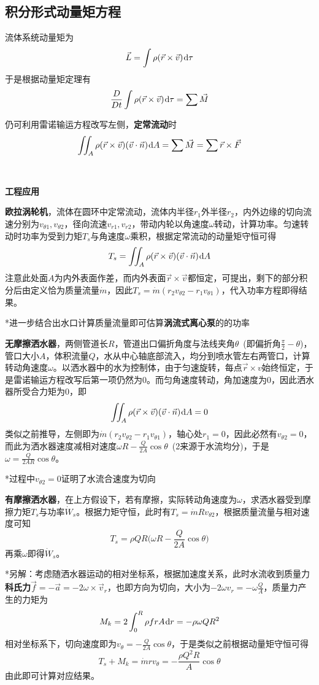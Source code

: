 \documentclass[a4paper,UTF8,fontset=windows]{ctexart}
\newcommand*{\dr}{\hspace{0.07em}\mathrm{d}}
\begin{document}
\subsection{积分形式动量矩方程}
流体系统动量矩为
$$\vec{L}=\int\rho(\vec{r}\times\vec{v})\dr\tau$$
于是根据动量矩定理有
$$\frac{D}{Dt}\int\rho(\vec{r}\times\vec{v})\dr\tau=\sum\vec{M}$$

仍可利用雷诺输运方程改写左侧，\textbf{定常流动}时
$$\iint_A\rho(\vec{r}\times\vec{v})(\vec{v}\cdot\vec{n})\dr A=\sum\vec{M}=\sum\vec{r}\times\vec{F}$$

\

\textbf{工程应用}

\textbf{欧拉涡轮机}，流体在圆环中定常流动，流体内半径$r_1$外半径$r_2$，内外边缘的切向流速分别为$v_{\theta 1},v_{\theta 2}$，径向流速$v_{r1},v_{r2}$，带动内轮以角速度$\omega$转动，计算功率。匀速转动时功率为受到力矩$T_s$与角速度$\omega$乘积，根据定常流动的动量矩守恒可得
$$T_s=\iint_A\rho(\vec{r}\times\vec{v})(\vec{v}\cdot\vec{n})\dr A$$
注意此处面$A$为内外表面作差，而内外表面$\vec{r}\times\vec{v}$都恒定，可提出，剩下的部分积分后由定义恰为质量流量$\dot{m}$，因此$T_s=\dot{m}(r_2v_{\theta 2}-r_1v_{\theta 1})$，代入功率方程即得结果。

*进一步结合出水口计算质量流量即可估算\textbf{涡流式离心泵}的的功率

\textbf{无摩擦洒水器}，两侧管道长$R$，管道出口偏折角度与法线夹角$\theta$\ (即偏折角$\frac{\pi}{2}-\theta$)，管口大小$A$，体积流量$Q$，水从中心轴底部流入，均分到喷水管左右两管口，计算转动角速度$\omega$。以洒水器中的水为控制体，由于匀速旋转，每点$\vec{r}\times{v}$始终恒定，于是雷诺输运方程改写后第一项仍然为0。而匀角速度转动，角加速度为0，因此洒水器所受合力矩为0，即
$$\iint_A\rho(\vec{r}\times\vec{v})(\vec{v}\cdot\vec{n})\dr A=0$$
类似之前推导，左侧即为$\dot{m}(r_2v_{\theta 2}-r_1v_{\theta 1})$，轴心处$r_1=0$，因此必然有$v_{\theta 2}=0$，而此为洒水器速度减相对速度$\omega R-\frac{Q}{2A}\cos\theta$\ (2来源于水流均分)，于是$\omega=\frac{Q}{2AR}\cos\theta$。

*过程中$v_{\theta 2}=0$证明了水流合速度为切向

\textbf{有摩擦洒水器}，在上方假设下，若有摩擦，实际转动角速度为$\omega$，求洒水器受到摩擦力矩$T_s$与功率$\dot{W}_s$。根据力矩守恒，此时有$T_s=\dot{m}Rv_{\theta 2}$，根据质量流量与相对速度可知
$$T_s=\rho QR\bigg(\omega R-\frac{Q}{2A}\cos\theta\bigg)$$
再乘$\omega$即得$\dot{W}_s$。

*另解：考虑随洒水器运动的相对坐标系，根据加速度关系，此时水流收到质量力\textbf{科氏力}$\vec{f}=-\vec{a}=-2\omega\times\vec{v}_r$，也即方向为切向，大小为$-2\omega v_r=-\omega\frac{Q}{A}$，质量力产生的力矩为
$$M_k=2\int_0^R\rho f rA\dr r=-\rho\omega QR^2$$
相对坐标系下，切向速度即为$v_\theta=-\frac{Q}{2A}\cos\theta$，于是类似之前根据动量矩守恒可得
$$T_s+M_k=\dot{m}rv_\theta=-\frac{\rho Q^2R}{A}\cos\theta$$
由此即可计算对应结果。
\end{document}
